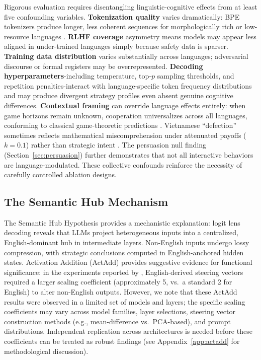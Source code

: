 \documentclass[11pt]{article}
\begin{document}
Rigorous evaluation requires disentangling linguistic-cognitive effects from at least five confounding variables. \textbf{Tokenization quality} varies dramatically: BPE tokenizers produce longer, less coherent sequences for morphologically rich or low-resource languages \citep{yong2024lowresource}. \textbf{RLHF coverage} asymmetry means models may appear less aligned in under-trained languages simply because safety data is sparser. \textbf{Training data distribution} varies substantially across languages; adversarial discourse or formal registers may be overrepresented. \textbf{Decoding hyperparameters}-including temperature, top-$p$ sampling thresholds, and repetition penalties-interact with language-specific token frequency distributions and may produce divergent strategy profiles even absent genuine cognitive differences. \textbf{Contextual framing} can override language effects entirely: when game horizons remain unknown, cooperation universalizes across all languages, conforming to classical game-theoretic predictions \citep{buscemi2025fairgame, lore2024framing}. Vietnamese ``defection'' sometimes reflects mathematical miscomprehension under attenuated payoffs ($k=0.1$) rather than strategic intent \citep{huynh2025fairgame}. The persuasion null finding (Section~\ref{sec:persuasion}) further demonstrates that not all interactive behaviors are language-modulated. These collective confounds reinforce the necessity of carefully controlled ablation designs.

\subsection{The Semantic Hub Mechanism}
\label{sec:semantic_hub}

The Semantic Hub Hypothesis \citep{wu2024semantichub} provides a mechanistic explanation: logit lens decoding reveals that LLMs project heterogeneous inputs into a centralized, English-dominant hub in intermediate layers. Non-English inputs undergo lossy compression, with strategic conclusions computed in English-anchored hidden states. Activation Addition (ActAdd) provides suggestive evidence for functional significance: in the experiments reported by \citet{wu2024semantichub}, English-derived steering vectors required a larger scaling coefficient (approximately 5, vs.\ a standard 2 for English) to alter non-English outputs. However, we note that these ActAdd results were observed in a limited set of models and layers; the specific scaling coefficients may vary across model families, layer selections, steering vector construction methods (e.g., mean-difference vs.\ PCA-based), and prompt distributions. Independent replication across architectures is needed before these coefficients can be treated as robust findings (see Appendix~\ref{app:actadd} for methodological discussion).
\end{document}
